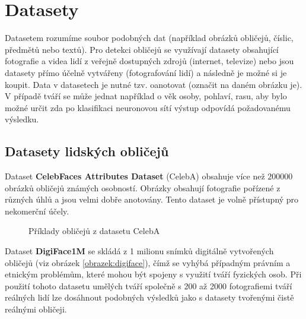 \section{Datasety}
\label{sekce:datasety}
Datasetem rozumíme soubor podobných dat (například obrázků obličejů, číslic, předmětů nebo textů). Pro detekci obličejů se využívají datasety obsahující fotografie a videa lidí z veřejně dostupných zdrojů (internet, televize) nebo jsou datasety přímo účelně vytvářeny (fotografování lidí) a následně je možné si je koupit. Data v datasetech je nutné tzv. oanotovat (označit na daném obrázku je). V případě tváří se může jednat například o věk osoby, pohlaví, rasu, aby bylo možné určit zda po klasifikaci neuronovou sítí výstup odpovídá požadovanému výsledku.

\subsection*{Datasety lidských obličejů}
Dataset \textbf{CelebFaces Attributes Dataset} (CelebA) \cite{celeba} obsahuje více než $200 000$ obrázků obličejů známých osobností. Obrázky obsahují fotografie pořízené z různých úhlů a jsou velmi dobře anotovány. Tento dataset je volně přístupný pro nekomerční účely.

\begin{figure}[H]
  \begin{center}
  \label{obrazek:celeba}
  \caption{Příklady obličejů z datasetu CelebA}
  \end{center}
\end{figure}

Dataset \textbf{DigiFace1M} \cite{digiface1m} se skládá z 1 milionu snímků digitálně vytvořených obličejů (viz obrázek \ref{obrazek:digiface}), čímž se vyhýbá případným právním a etnickým problémům, které mohou být spojeny s využití tváří fyzických osob. Při použití tohoto datasetu umělých tváří společně s 200 až 2000 fotografiemi tváří reálných lidí lze dosáhnout podobných výsledků jako s datasety tvořenými čistě reálnými obličeji.

